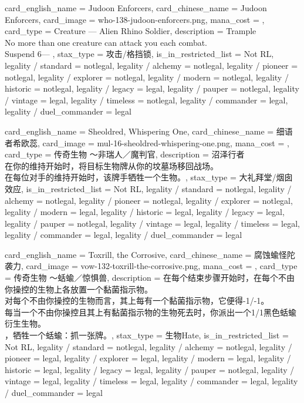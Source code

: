 \documentclass[lang = cn, color = black, 10pt]{AllThatStax}
\begin{document}
\card
{
	card_english_name = {Judoon Enforcers},
	card_chinese_name = {Judoon Enforcers},
	card_image = who-138-judoon-enforcers.png,
	mana_cost = ,
	card_type = Creature — Alien Rhino Soldier,
	description = {Trample\\
		No more than one creature can attack you each combat.\\
		Suspend 6— },
	stax_type = 攻击/格挡锁,
	is_in_restricted_list = Not RL,
	legality / standard = notlegal,
	legality / alchemy = notlegal,
	legality / pioneer = notlegal,
	legality / explorer = notlegal,
	legality / modern = notlegal,
	legality / historic = notlegal,
	legality / legacy = legal,
	legality / pauper = notlegal,
	legality / vintage = legal,
	legality / timeless = notlegal,
	legality / commander = legal,
	legality / duel_commander = legal
}

\card
{
	card_english_name = {Sheoldred, Whispering One},
	card_chinese_name = {细语者希欧蕊},
	card_image = mul-16-sheoldred-whispering-one.png,
	mana_cost = ,
	card_type = 传奇生物 ～非瑞人／魔判官,
	description = {沼泽行者\\
		在你的维持开始时，将目标生物牌从你的坟墓场移回战场。\\
		在每位对手的维持开始时，该牌手牺牲一个生物。},
	stax_type = 大礼拜堂/烟囱效应,
	is_in_restricted_list = Not RL,
	legality / standard = notlegal,
	legality / alchemy = notlegal,
	legality / pioneer = notlegal,
	legality / explorer = notlegal,
	legality / modern = legal,
	legality / historic = legal,
	legality / legacy = legal,
	legality / pauper = notlegal,
	legality / vintage = legal,
	legality / timeless = legal,
	legality / commander = legal,
	legality / duel_commander = legal
}

\card
{
	card_english_name = {Toxrill, the Corrosive},
	card_chinese_name = {腐蚀蝓怪陀袭力},
	card_image = vow-132-toxrill-the-corrosive.png,
	mana_cost = ,
	card_type = 传奇生物 ～蛞蝓／惊惧兽,
	description = {在每个结束步骤开始时，在每个不由你操控的生物上各放置一个黏菌指示物。\\
		对每个不由你操控的生物而言，其上每有一个黏菌指示物，它便得-1/-1。\\
		每当一个不由你操控且其上有黏菌指示物的生物死去时，你派出一个1/1黑色蛞蝓衍生生物。\\
		，牺牲一个蛞蝓：抓一张牌。},
	stax_type = 生物Hate,
	is_in_restricted_list = Not RL,
	legality / standard = notlegal,
	legality / alchemy = notlegal,
	legality / pioneer = legal,
	legality / explorer = legal,
	legality / modern = legal,
	legality / historic = legal,
	legality / legacy = legal,
	legality / pauper = notlegal,
	legality / vintage = legal,
	legality / timeless = legal,
	legality / commander = legal,
	legality / duel_commander = legal
}
\end{document}
